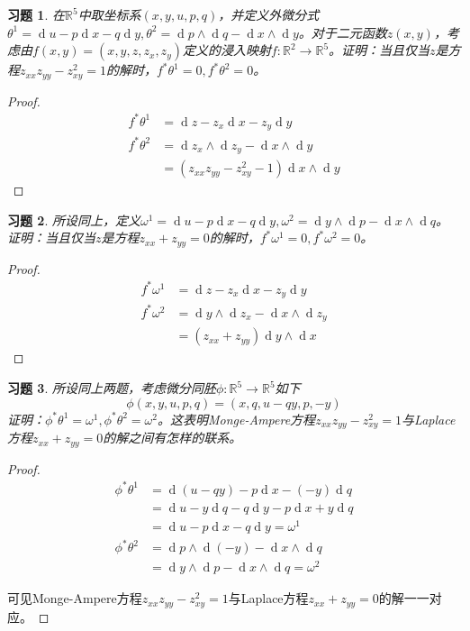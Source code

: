 \documentclass[winfonts,UTF8,c5size,a4paper,fancyhdr,hyperref,titlepage,nocap]{ctexart}
\newtheorem{xiti}{习题}
\theoremstyle{definition}
\theoremstyle{remark}
\numberwithin{equation}{subsection}
\newcommand{\Real}{\mathbb{R}}
\newcommand{\dd}{\operatorname{d}}
\begin{document}
\begin{xiti}
  在$\Real^5$中取坐标系$(x,y,u,p,q)$，并定义外微分式$\theta^1=\dd u-p\dd x-q\dd y, \theta^2=\dd p\wedge\dd q-\dd x\wedge\dd y$。对于二元函数$z(x,y)$，考虑由$f(x,y)=(x,y,z,z_x,z_y)$定义的浸入映射$f\colon\Real^2\to\Real^5$。证明：当且仅当$z$是方程$z_{xx}z_{yy}-z_{xy}^2=1$的解时，$f^{\ast}\theta^1=0, f^{\ast}\theta^2=0$。
\end{xiti}
\begin{proof}
  \begin{align*}
    f^{\ast}\theta^1&=\dd z-z_x\dd x-z_y\dd y \\
    f^{\ast}\theta^2&=\dd z_x\wedge\dd z_y-\dd x\wedge\dd y\\
                             &=(z_{xx}z_{yy}-z_{xy}^2-1)\dd x\wedge\dd y
  \end{align*}
\end{proof}

\begin{xiti}
  所设同上，定义$\omega^1=\dd u-p\dd x-q\dd y,\omega^2=\dd y\wedge\dd p-\dd x\wedge\dd q$。证明：当且仅当$z$是方程$z_{xx}+z_{yy}=0$的解时，$f^{\ast}\omega^1=0, f^{\ast}\omega^2=0$。
\end{xiti}
\begin{proof}
  \begin{align*}
    f^{\ast}\omega^1&=\dd z-z_x\dd x-z_y\dd y \\
    f^{\ast}\omega^2&=\dd y\wedge\dd z_x-\dd x\wedge\dd z_y\\
                               &=(z_{xx}+z_{yy})\dd y\wedge\dd x
  \end{align*}
\end{proof}

\begin{xiti}
  所设同上两题，考虑微分同胚$\phi\colon\Real^5\to\Real^5$如下
  \begin{equation*}
    \phi(x,y,u,p,q)=(x,q,u-qy,p,-y)
  \end{equation*}
  证明：$\phi^{\ast}\theta^1=\omega^1,\phi^{\ast}\theta^2=\omega^2$。这表明Monge-Ampere方程$z_{xx}z_{yy}-z_{xy}^2=1$与Laplace方程$z_{xx}+z_{yy}=0$的解之间有怎样的联系。
\end{xiti}
\begin{proof}
  \begin{align*}
    \phi^{\ast}\theta^1&=\dd (u-qy)-p\dd x-(-y)\dd q \\
                                  &=\dd u-y\dd q-q\dd y-p\dd x+y\dd q\\
                                  &=\dd u-p\dd x-q\dd y=\omega^1\\
    \phi^{\ast}\theta^2&=\dd p\wedge\dd (-y)-\dd x\wedge\dd q\\
                                  &=\dd y\wedge\dd p-\dd x\wedge\dd q=\omega^2
  \end{align*}

  可见Monge-Ampere方程$z_{xx}z_{yy}-z_{xy}^2=1$与Laplace方程$z_{xx}+z_{yy}=0$的解一一对应。
\end{proof}
\end{document}
